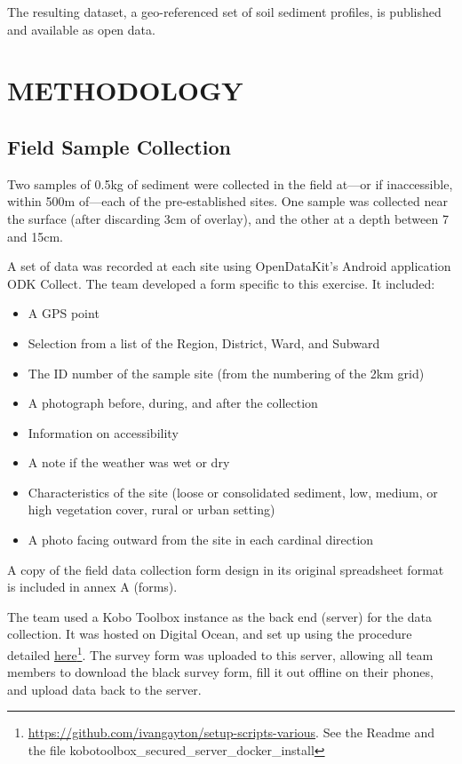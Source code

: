 \documentclass[a4paper,12pt,twoside]{article}
\begin{document}
The resulting dataset, a geo-referenced set of soil sediment profiles, is published and available as open data.


\newpage
\color{RHblue}
\section{METHODOLOGY}
\label{methodology}

\subsection{Field Sample Collection}
\label{fieldsamplecollection}
\color{RHgrey}
Two samples of 0.5kg of sediment were collected in the field at---or if inaccessible, within 500m of---each of the pre-established sites. One sample was collected near the surface (after discarding 3cm of overlay), and the other at a depth between 7 and 15cm.

A set of data was recorded at each site using OpenDataKit's Android application ODK Collect. The team developed a form specific to this exercise. It included:
\begin{itemize}
  \item A GPS point
  \item Selection from a list of the Region, District, Ward, and Subward
  \item The ID number of the sample site (from the numbering of the 2km grid)
  \item A photograph before, during, and after the collection
  \item Information on accessibility
  \item A note if the weather was wet or dry
  \item Characteristics of the site (loose or consolidated sediment, low, medium, or high vegetation cover, rural or urban setting)
  \item A photo facing outward from the site in each cardinal direction
\end{itemize}

A copy of the field data collection form design in its original spreadsheet format is included in annex A (forms).

The team used a Kobo Toolbox instance as the back end (server) for the data collection. It was hosted on Digital Ocean, and set up using the procedure detailed \href{https://github.com/ivangayton/setup-scripts-various}{here}\footnote{\url {https://github.com/ivangayton/setup-scripts-various}. \color{RHgrey}See the Readme and the file kobotoolbox\_secured\_server\_docker\_install}. The survey form was uploaded to this server, allowing all team members to download the black survey form, fill it out offline on their phones, and upload data back to the server. 
\end{document}
